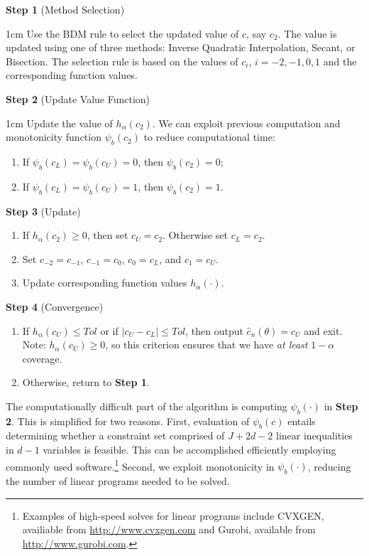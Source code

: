 \documentclass[letterpaper,11pt]{article}
\theoremstyle{myplain}
\theoremstyle{mydefinition}
\theoremstyle{myremark}
\numberwithin{equation}{section}
\numberwithin{figure}{section}
\newenvironment{parindent1}{\begin{adjustwidth}{1cm}{}}{\end{adjustwidth}}
\begin{document}
\begin{appendices}
\textbf{Step 1} (Method Selection)

\begin{parindent1}
Use the BDM rule to select the updated value of $c$, say $c_2$.  The value is updated using one of three methods: Inverse Quadratic Interpolation, Secant, or Bisection.  The selection rule is based on the values of $c_{i}$, $i=-2,-1,0,1$ and the corresponding function values.
\end{parindent1}

\textbf{Step 2} (Update Value Function)

\begin{parindent1}
Update the value of $h_{\alpha}(c_2)$.  We can exploit previous computation and monotonicity function $\psi_b(c_2)$ to reduce computational time:
\begin{enumerate}
\item If $\psi_b(c_L) = \psi_b(c_U) = 0$, then $\psi_b(c_2) = 0$;
\item If $\psi_b(c_L) = \psi_b(c_U) = 1$, then $\psi_b(c_2) = 1$.
\end{enumerate}
\end{parindent1}

\textbf{Step 3} (Update)
\begin{enumerate}[label=(\roman*)]

\item If $h_{\alpha}(c_2) \geq 0$, then set $c_U = c_2$.  Otherwise set $c_L = c_2$.
\item Set $c_{-2} = c_{-1}$, $c_{-1} = c_0$, $c_0 = c_L$, and $c_1 = c_U$.
\item Update corresponding function values $h_{\alpha}(\cdot)$.
\end{enumerate}

\textbf{Step 4} (Convergence)
\begin{enumerate}[label=(\roman*)]

\item If $h_{\alpha}(c_U) \leq \mathit{Tol}$ or if $|c_U - c_L| \leq \mathit{Tol}$, then output $\hat c_n(\theta) = c_U$ and exit. Note: $h_{\alpha}(c_U) \geq 0$, so this criterion ensures that we have \emph{at least} $1-\alpha$ coverage.
\item Otherwise, return to \textbf{Step 1}.
\end{enumerate}
The computationally difficult part of the algorithm is computing $\psi_b(\cdot)$ in \textbf{Step 2}.  This is simplified for two reasons.  First, evaluation of $\psi_b(c)$ entails determining whether a constraint set comprised of $J+2d-2$ linear inequalities in $d-1$ variables is feasible.  This can be accomplished efficiently employing commonly used software.\footnote{Examples of high-speed solves for linear programs include CVXGEN, availiable from \url{http://www.cvxgen.com} and Gurobi, available from \url{http://www.gurobi.com}.}  Second, we exploit monotonicity in $\psi_b(\cdot)$, reducing the number of linear programs needed to be solved.


\end{appendices}
\end{document}

